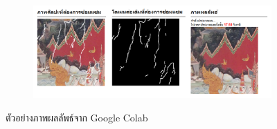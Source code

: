 \begin{figure}[H]
    \centering
    \begin{subfigure}{0.8\linewidth}
        \centering
        \includegraphics[width=1\linewidth]{image/appendix_colab/inpaint_display.png}
    \end{subfigure}
    \caption{ตัวอย่างภาพผลลัพธ์จาก Google Colab}
\end{figure}